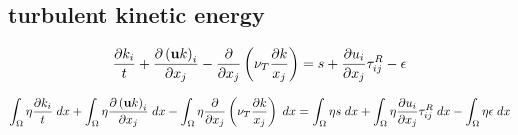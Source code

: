 \documentclass[11pt,a4paper]{article}
\begin{document}
\subsection{turbulent kinetic energy}

\begin{dmath}
  \frac{\partial k_i}{t} + \frac{\partial \left( {\bf u} k \right)_i}{\partial x_j} - \frac{\partial}{\partial x_j} \left( \nu_T \frac{\partial k}{x_j} \right) = s + \frac{\partial u_i}{\partial x_j} \tau_{ij}^R - \epsilon
\end{dmath}

\begin{dmath}
  \int_\Omega \eta \frac{\partial k_i}{t} \; dx + \int_\Omega \eta \frac{\partial \left( {\bf u} k \right)_i}{\partial x_j} \; dx - \int_\Omega \eta \frac{\partial}{\partial x_j} \left( \nu_T \frac{\partial k}{x_j} \right) \; dx = \int_\Omega \eta s \; dx + \int_\Omega \eta \frac{\partial u_i}{\partial x_j} \tau_{ij}^R \; dx - \int_\Omega \eta \epsilon \; dx
\end{dmath}


\end{document}
